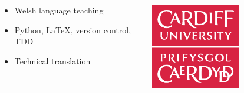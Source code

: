 \documentclass{beamer}
\begin{document}
\begin{frame}
  \begin{columns}
    \begin{column}{0.5\textwidth}
      \begin{itemize}
        \setlength\itemsep{3em}
        \item Welsh language teaching
        \item Python, \LaTeX, version control, TDD
        \item Technical translation
      \end{itemize}
    \end{column}
    \begin{column}{0.5\textwidth}
      \begin{center}
        \begin{center}
          \includegraphics[width=0.6\textwidth]{cflogo}
        \end{center}
        \vspace{7mm}
      \end{center}
    \end{column}
  \end{columns}
\end{frame}
\end{document}
